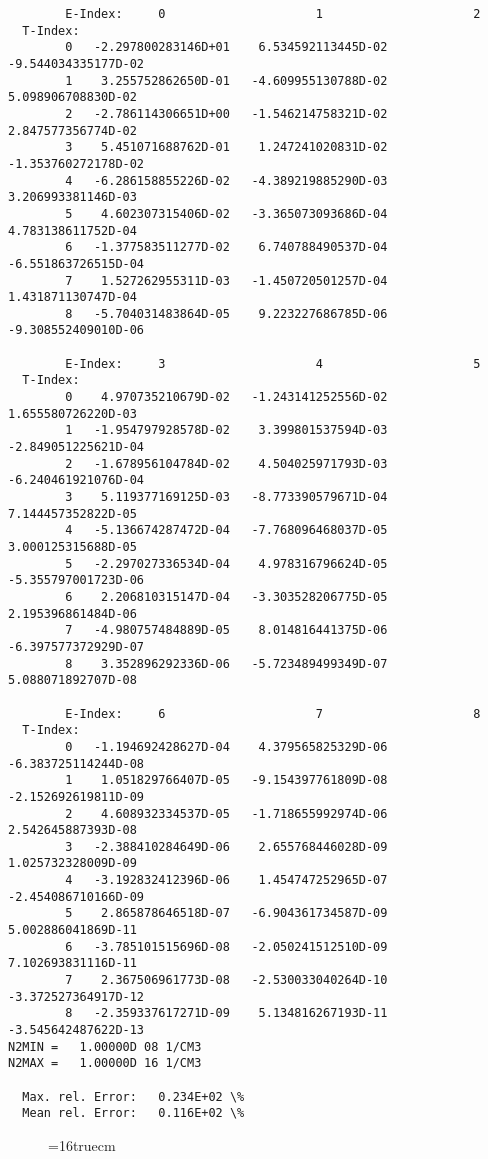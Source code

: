\documentclass[12pt,dvipdfmx]{article}
\begin{document}
\begin{small}\begin{verbatim}
        E-Index:     0                     1                     2
  T-Index:
        0   -2.297800283146D+01    6.534592113445D-02   -9.544034335177D-02
        1    3.255752862650D-01   -4.609955130788D-02    5.098906708830D-02
        2   -2.786114306651D+00   -1.546214758321D-02    2.847577356774D-02
        3    5.451071688762D-01    1.247241020831D-02   -1.353760272178D-02
        4   -6.286158855226D-02   -4.389219885290D-03    3.206993381146D-03
        5    4.602307315406D-02   -3.365073093686D-04    4.783138611752D-04
        6   -1.377583511277D-02    6.740788490537D-04   -6.551863726515D-04
        7    1.527262955311D-03   -1.450720501257D-04    1.431871130747D-04
        8   -5.704031483864D-05    9.223227686785D-06   -9.308552409010D-06

        E-Index:     3                     4                     5
  T-Index:
        0    4.970735210679D-02   -1.243141252556D-02    1.655580726220D-03
        1   -1.954797928578D-02    3.399801537594D-03   -2.849051225621D-04
        2   -1.678956104784D-02    4.504025971793D-03   -6.240461921076D-04
        3    5.119377169125D-03   -8.773390579671D-04    7.144457352822D-05
        4   -5.136674287472D-04   -7.768096468037D-05    3.000125315688D-05
        5   -2.297027336534D-04    4.978316796624D-05   -5.355797001723D-06
        6    2.206810315147D-04   -3.303528206775D-05    2.195396861484D-06
        7   -4.980757484889D-05    8.014816441375D-06   -6.397577372929D-07
        8    3.352896292336D-06   -5.723489499349D-07    5.088071892707D-08

        E-Index:     6                     7                     8
  T-Index:
        0   -1.194692428627D-04    4.379565825329D-06   -6.383725114244D-08
        1    1.051829766407D-05   -9.154397761809D-08   -2.152692619811D-09
        2    4.608932334537D-05   -1.718655992974D-06    2.542645887393D-08
        3   -2.388410284649D-06    2.655768446028D-09    1.025732328009D-09
        4   -3.192832412396D-06    1.454747252965D-07   -2.454086710166D-09
        5    2.865878646518D-07   -6.904361734587D-09    5.002886041869D-11
        6   -3.785101515696D-08   -2.050241512510D-09    7.102693831116D-11
        7    2.367506961773D-08   -2.530033040264D-10   -3.372527364917D-12
        8   -2.359337617271D-09    5.134816267193D-11   -3.545642487622D-13
N2MIN =   1.00000D 08 1/CM3
N2MAX =   1.00000D 16 1/CM3

  Max. rel. Error:   0.234E+02 \%
  Mean rel. Error:   0.116E+02 \%

\end{verbatim}\end{small}
\begin{figure} \label{2.2.17mar}
\epsfxsize=16truecm
\end{figure}
\newpage
\end{document}
